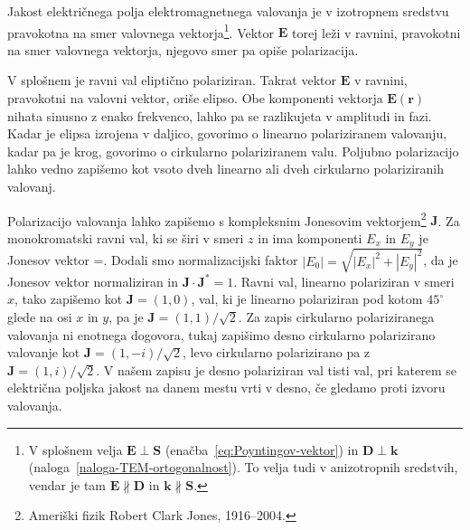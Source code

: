 Jakost električnega polja elektromagnetnega valovanja je v izotropnem
sredstvu pravokotna na smer valovnega vektorja\footnote{V splošnem velja $\mathbf{E}\perp\mathbf{S}$ 
(enačba~\ref{eq:Poyntingov-vektor}) in $\mathbf{D}\perp\mathbf{k}$ (naloga~\ref{naloga-TEM-ortogonalnost}). 
To velja tudi v anizotropnih sredstvih, vendar je tam $\mathbf{E} \nparallel \mathbf{D}$ in 
$\mathbf k\nparallel\mathbf S$.}. Vektor $\mathbf{E}$
torej leži v ravnini, pravokotni na smer valovnega vektorja, njegovo
smer pa opiše polarizacija. 

V splošnem je ravni val eliptično polariziran. Takrat vektor $\mathbf E$
v ravnini, pravokotni na valovni vektor, oriše elipso. Obe komponenti vektorja 
$\mathbf{E}(\mathbf{r})$ nihata sinusno z enako frekvenco, lahko pa se razlikujeta
v amplitudi in fazi. Kadar je elipsa izrojena v daljico, govorimo o linearno polariziranem 
valovanju,
kadar pa je krog, govorimo o cirkularno polariziranem valu. 
Poljubno polarizacijo lahko vedno zapišemo kot vsoto dveh linearno ali dveh cirkularno polariziranih
valovanj. 

Polarizacijo valovanja lahko zapišemo s kompleksnim Jonesovim 
vektorjem\footnote{Ameriški fizik Robert Clark Jones, 1916--2004.}
$\mathbf{J}$. Za monokromatski ravni val, ki se širi v smeri $z$ in ima komponenti $E_x$ in $E_y$ je
Jonesov vektor
\beq
{}=\left[\begin{array}{c}
E_{x}\\
E_{y}
\end{array}\right].
\eeq
Dodali smo normalizacijski faktor $|E_{0}|=\sqrt{|E_{x}|^{2}+|E_{y}|^{2}}$,
da je Jonesov vektor normaliziran in $\mathbf{J}\cdot\mathbf{J}^{*}=1$.
Ravni val, linearno polariziran v smeri $x$, tako zapišemo kot $\mathbf{J}=\left(1,0\right)$,
val, ki je linearno polariziran pod kotom $45^{\circ}$ glede na osi
$x$ in $y$, pa je $\mathbf{J}=\left(1,1\right)/\sqrt{2}$.
Za zapis cirkularno polariziranega valovanja ni enotnega dogovora, tukaj zapišimo
desno cirkularno polarizirano valovanje kot 
$\mathbf{J}=\left(1,-i\right)/\sqrt{2}$,
levo cirkularno polarizirano pa z $\mathbf{J}=\left(1,i\right)/\sqrt{2}$.
V našem zapisu je desno polariziran val tisti val, pri katerem se električna
poljska jakost na danem mestu vrti v desno, če gledamo proti izvoru valovanja. 

